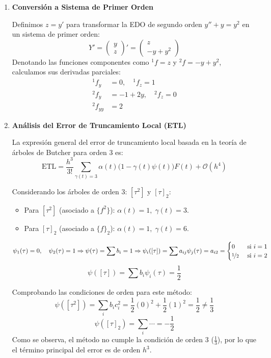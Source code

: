 \begin{sol}
\begin{enumerate}
\item \textbf{Conversión a Sistema de Primer Orden}

Definimos $z = y'$ para transformar la EDO de segundo orden $y'' + y = y^2$ en un sistema de primer orden:
\[
Y' = \begin{pmatrix} y \\ z \end{pmatrix}' = \begin{pmatrix} z \\ -y + y^2 \end{pmatrix}
\]
Denotando las funciones componentes como ${}^1\!f = z$ y ${}^2\!f = -y + y^2$, calculamos sus derivadas parciales:
\begin{align*}
{}^1\!f_y &= 0, \quad {}^1\!f_z = 1 \\
{}^2\!f_y &= -1 + 2y, \quad {}^2\!f_z = 0 \\
{}^2\!f_{yy} &= 2
\end{align*}

\item \textbf{Análisis del Error de Truncamiento Local (ETL)} 

La expresión general del error de truncamiento local basada en la teoría de árboles de Butcher para orden 3 es:
\[
\text{ETL} = \frac{h^3}{3!} \sum_{\gamma(t)=3} \alpha(t) \big(1 - \gamma(t)\psi(t)\big) F(t) + \mathcal{O}(h^4)
\]

Considerando los árboles de orden 3: $[\tau^2]$ y $[\tau]_2$:
\begin{itemize}
    \item Para $[\tau^2]$ (asociado a $\{f^2\}$): $\alpha(t) = 1, \; \gamma(t) = 3$.
    \item Para $[\tau]_2$ (asociado a $\{f\}_2$): $\alpha(t) = 1, \; \gamma(t) = 6$.
\end{itemize}
$$\psi_1(\tau)=0, \quad \psi_2(\tau)=1  \Rightarrow \psi(\tau) = \sum b_i =1 \Rightarrow \psi_i([\tau]) = \sum a_{ij} \psi_j(\tau) = a_{i2} = \begin{cases}
    0 & \text{ si } i=1 \\ \nicefrac{1}{2} & \text{ si } i=2
\end{cases}$$
$$\psi([\tau]) = \sum b_i \psi_i(\tau)=\frac{1}{2}$$

Comprobando las condiciones de orden para este método:
\[
\psi([\tau^2]) = \sum_{i} b_i c_i^2 = \frac{1}{2}(0)^2 + \frac{1}{2}(1)^2 = \frac{1}{2} \neq \frac{1}{3}
\]
\[
\psi([\tau]_2) = \sum_{i} \cdots = -\frac{1}{2}
\]
Como se observa, el método no cumple la condición de orden 3 ($\frac{1}{3}$), por lo que el término principal del error es de orden $h^3$.


\end{enumerate}
\end{sol}
